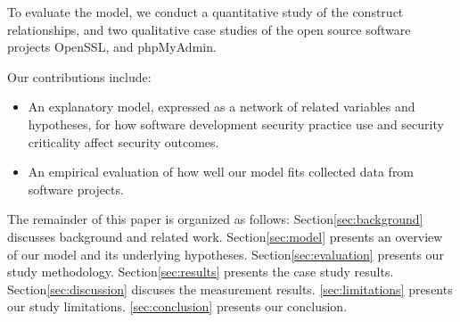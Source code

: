 To evaluate the model, we conduct a quantitative study of the construct relationships, and two qualitative case studies of the open source software projects OpenSSL, and phpMyAdmin.
  
Our contributions include:
\begin{itemize}
\item An explanatory model, expressed as a network of related variables and hypotheses, for how software development security practice use and security criticality affect security outcomes.
\item An empirical evaluation of how well our model fits collected data from software projects. 
\end{itemize}
The remainder of this paper is organized as follows:  Section\ref{sec:background} discusses background and related work. Section\ref{sec:model} presents an overview of our model and its underlying hypotheses. Section\ref{sec:evaluation} presents our study methodology. Section\ref{sec:results} presents the case study results. Section\ref{sec:discussion} discuses the measurement results. \ref{sec:limitations} presents our study limitations. \ref{sec:conclusion} presents our conclusion.
